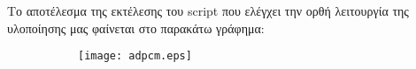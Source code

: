 \noindent
\begin{minipage}{\linewidth}
  \par Το αποτέλεσμα της εκτέλεσης του script που ελέγχει την ορθή λειτουργία της υλοποίησης μας
  φαίνεται στο παρακάτω γράφημα:
  \begin{figure}[H]
    \label{fig:adpcm}
    \centering
    \begin{subfigure}{1.0\textwidth}
      \centering
      \texttt{[image: adpcm.eps]}
    \end{subfigure}
    \caption{}
  \end{figure}
\end{minipage}


